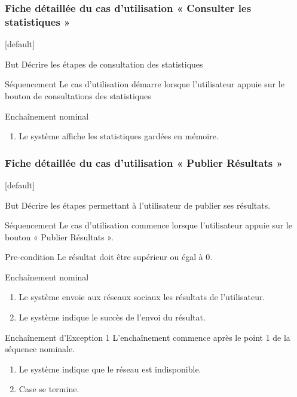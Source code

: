 \documentclass{beamer}
\begin{document}
\begin{frame}
  \frametitle{Fiche détaillée du cas d'utilisation « Consulter les statistiques »}
  [default]
  \begin{block}{\footnotesize{But}}
    \scriptsize{Décrire les étapes de consultation des statistiques}
  \end{block}
  \pause
  \begin{block}{\footnotesize{Séquencement}}
    \scriptsize{Le cas d'utilisation démarre lorsque l'utilisateur appuie sur le bouton de consultations des statistiques}
  \end{block}
  \pause
  \begin{block}{\footnotesize{Enchaînement nominal}}
    \begin{enumerate}    
      [circle]
      \item
        \scriptsize{Le système affiche les statistiques gardées en mémoire.}
    \end{enumerate}
  \end{block}
\end{frame}
\begin{frame}
  \frametitle{Fiche détaillée du cas d'utilisation « Publier Résultats »}
  [default]
  \begin{block}{\footnotesize{But}}
    \scriptsize{Décrire les étapes permettant à l'utilisateur de publier ses résultats.}
  \end{block}
  \pause
  \begin{block}{\footnotesize{Séquencement}}
    \scriptsize{Le cas d'utilisation commence lorsque l'utilisateur appuie sur le bouton « Publier Résultats ».}
  \end{block}
  \pause
  \begin{block}{\footnotesize{Pre-condition}}
    \scriptsize{Le résultat doit être supérieur ou égal à 0.}
  \end{block}
  \pause
  \begin{block}{\footnotesize{Enchaînement nominal}}
    \begin{enumerate}    
      [circle]
    \item
      \scriptsize{Le système envoie aux réseaux sociaux les résultats de l'utilisateur.}
    \item
      \scriptsize{Le système indique le succès de l'envoi du résultat. }
    \end{enumerate}
  \end{block}
  \pause
  \begin{block}{\footnotesize{Enchaînement d’Exception 1}}
  \scriptsize{L'enchaînement commence après le point 1 de la séquence nominale.}
    \begin{enumerate}
      \item
        \scriptsize{Le système indique que le réseau est indisponible.}
      \item
        \scriptsize{Case se termine.}
    \end{enumerate}
  \end{block}
\end{frame}
\end{document}
